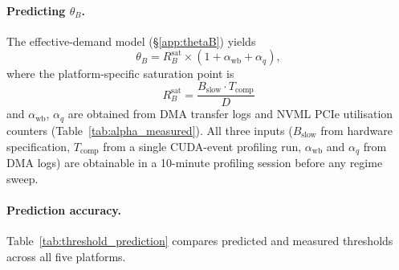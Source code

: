 \paragraph{Predicting $\theta_B$.}
The effective-demand model (\S\ref{app:thetaB}) yields
\begin{equation}
\theta_B = R_B^{\mathrm{sat}} \times (1 + \alpha_{\mathrm{wb}} + \alpha_q),
\label{eq:thetaB_pred}
\end{equation}
where the platform-specific saturation point is
\begin{equation}
R_B^{\mathrm{sat}} = \frac{B_{\mathrm{slow}} \cdot T_{\mathrm{comp}}}{D}
\label{eq:RBsat_general}
\end{equation}
and $\alpha_{\mathrm{wb}}$, $\alpha_q$ are obtained from DMA transfer logs
and NVML PCIe utilisation counters (Table~\ref{tab:alpha_measured}).
All three inputs ($B_{\mathrm{slow}}$ from hardware specification,
$T_{\mathrm{comp}}$ from a single CUDA-event profiling run,
$\alpha_{\mathrm{wb}}$ and $\alpha_q$ from DMA logs) are obtainable in a
10-minute profiling session before any regime sweep.

\paragraph{Prediction accuracy.}
Table~\ref{tab:threshold_prediction} compares predicted and measured
thresholds across all five platforms.

